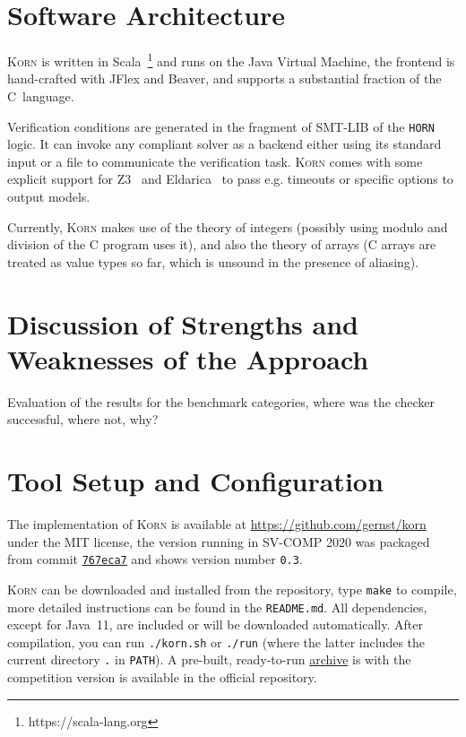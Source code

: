\documentclass{llncs}
\newcommand{\Korn}{\textsc{Korn}\xspace}
\begin{document}
\section{Software Architecture}
\label{sec:architecture}

\Korn is written in Scala~\footnote{https://scala-lang.org} and runs on the Java Virtual Machine,
the frontend is hand-crafted with JFlex and Beaver,
and supports a substantial fraction of the C~language.

Verification conditions are generated in the fragment of SMT-LIB of the \texttt{HORN} logic.
It can invoke any compliant solver as a backend either using its standard input or a file to communicate the verification task.
\Korn comes with some explicit support for Z3~\cite{gurfinkel2019science} and Eldarica~\cite{hojjat2018eldarica}
to pass e.g. timeouts or specific options to output models.

Currently, \Korn makes use of the theory of integers (possibly using modulo and division of the C program uses it),
and also the theory of arrays (C arrays are treated as value types so far, which is unsound in the presence of aliasing).

\section{Discussion of Strengths and Weaknesses of the Approach}
\label{sec:discussion}

Evaluation of the results for the benchmark categories, where was the checker successful, where not, why?

\section{Tool Setup and Configuration}
\label{sec:project}

The implementation of \Korn is available at
    \url{https://github.com/gernst/korn} under the MIT license,
the version running in SV-COMP 2020 was packaged from commit
\href{https://github.com/gernst/korn/commit/767eca718edf7f04e995142b679762242c68eef5}{\tt 767eca7}
and shows version number \texttt{0.3}.

\Korn can be downloaded and installed from the repository, type \texttt{make} to compile,
more detailed instructions can be found in the \texttt{README.md}.
All dependencies, except for Java~11, are included or will be downloaded automatically.
After compilation, you can run \texttt{./korn.sh} or \texttt{./run}
(where the latter includes the current directory \texttt{.} in \texttt{PATH}).
A pre-built, ready-to-run
\href{https://gitlab.com/gernst/svcomp-archives-2021/-/blob/master/2021/korn.zip}{archive}
is with the competition version is available in the official repository.
\end{document}

